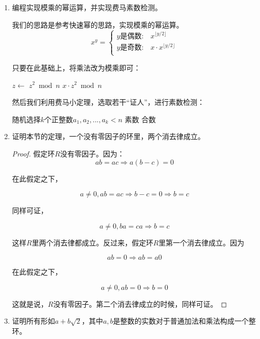 \documentclass[UTF8]{article}
\begin{document}
\begin{enumerate}
\item 编程实现模乘的幂运算，并实现费马素数检测。

我们的思路是参考快速幂的思路，实现模乘的幂运算。
\[
x^y =
\begin{cases}
y \text{是偶数}: & x^{\lfloor y / 2 \rfloor} \\
y \text{是奇数}: & x \cdot x^{\lfloor y / 2 \rfloor} \\
\end{cases}
\]

只要在此基础上，将乘法改为模乘即可：

\begin{algorithmic}
    \State {}
  \EndIf
  \State $z \gets$ 
    \State \Return $z^2 \bmod n$
  \Else
    \State \Return $x \cdot z^2 \bmod n$
  \EndIf
\EndFunction
\end{algorithmic}

然后我们利用费马小定理，选取若干“证人”，进行素数检测：

\begin{algorithmic}
  \State 随机选择$k$个正整数$a_1, a_2, ..., a_k < n$
    \State \Return 素数
  \Else
    \State \Return 合数
  \EndIf
\EndFunction
\end{algorithmic}

\item {证明本节的定理，一个没有零因子的环里，两个消去律成立。}

\begin{proof}
假定环$R$没有零因子。因为：
\[
  ab = ac \Rightarrow a(b - c) = 0
\]

在此假定之下，

\[
  a \neq 0, ab = ac \Rightarrow b - c = 0 \Rightarrow b = c
\]

同样可证，

\[
  a \neq 0, ba = ca \Rightarrow b = c
\]

这样$R$里两个消去律都成立。反过来，假定环$R$里第一个消去律成立。因为

\[
  ab = 0 \Rightarrow ab = a0
\]

在此假定之下，

\[
  a \neq 0, ab = 0 \Rightarrow b = 0
\]

这就是说，$R$没有零因子。第二个消去律成立的时候，同样可证。
\end{proof}

\item {证明所有形如$a + b \sqrt{2}$，其中$a, b$是整数的实数对于普通加法和乘法构成一个整环。}


\end{enumerate}
\end{document}
